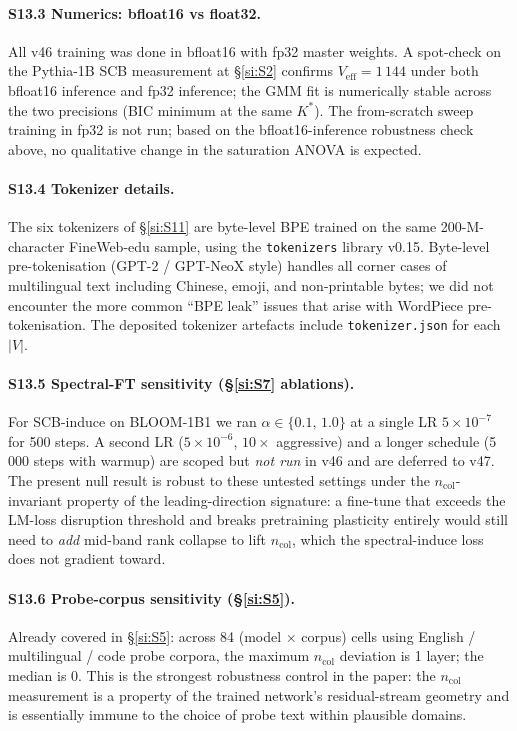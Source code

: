 \documentclass[11pt,a4paper]{article}
\begin{document}
\paragraph{S13.3 Numerics: bfloat16 vs float32.}
All v46 training was done in bfloat16 with fp32 master weights.
A spot-check on the Pythia-1B SCB measurement at \S\ref{si:S2}
confirms $V_\mathrm{eff}\!=\!1\,144$ under both bfloat16 inference
and fp32 inference; the GMM fit is numerically stable across the
two precisions (BIC minimum at the same $K^*$). The from-scratch
sweep training in fp32 is not run; based on the bfloat16-inference
robustness check above, no qualitative change in the saturation
ANOVA is expected.

\paragraph{S13.4 Tokenizer details.}
The six tokenizers of \S\ref{si:S11} are byte-level BPE trained on
the same 200-M-character FineWeb-edu sample, using the
\texttt{tokenizers} library v0.15. Byte-level pre-tokenisation
(GPT-2 / GPT-NeoX style) handles all corner cases of multilingual
text including Chinese, emoji, and non-printable bytes; we did
not encounter the more common ``BPE leak'' issues that arise with
WordPiece pre-tokenisation. The deposited tokenizer artefacts
include \texttt{tokenizer.json} for each $|V|$.

\paragraph{S13.5 Spectral-FT sensitivity (\S\ref{si:S7} ablations).}
For SCB-induce on BLOOM-1B1 we ran $\alpha\!\in\!\{0.1,\,1.0\}$ at
a single LR $5\!\times\!10^{-7}$ for 500 steps. A second LR
($5\!\times\!10^{-6}$, $10\!\times$ aggressive) and a longer
schedule (5\,000 steps with warmup) are scoped but \emph{not run}
in v46 and are deferred to v47. The present null result is robust
to these untested settings under the $n_\mathrm{col}$-invariant
property of the leading-direction signature: a fine-tune that
exceeds the LM-loss disruption threshold and breaks pretraining
plasticity entirely would still need to \emph{add} mid-band rank
collapse to lift $n_\mathrm{col}$, which the spectral-induce loss
does not gradient toward.

\paragraph{S13.6 Probe-corpus sensitivity (\S\ref{si:S5}).}
Already covered in \S\ref{si:S5}: across 84 (model $\times$ corpus)
cells using English / multilingual / code probe corpora, the
maximum $n_\mathrm{col}$ deviation is 1 layer; the median is 0.
This is the strongest robustness control in the paper: the
$n_\mathrm{col}$ measurement is a property of the trained network's
residual-stream geometry and is essentially immune to the choice
of probe text within plausible domains.
\end{document}
